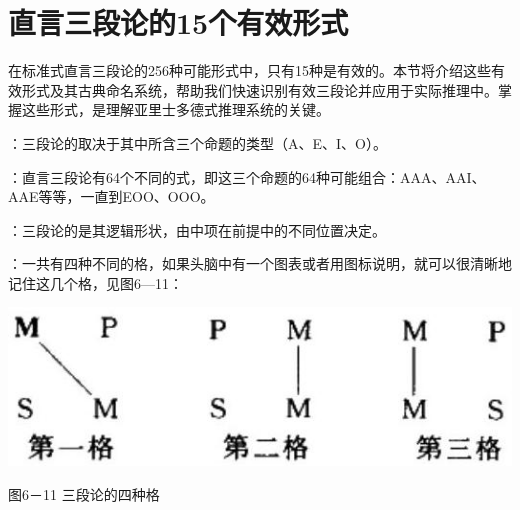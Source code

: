 \section{直言三段论的15个有效形式}

\begin{logicbox}[title=引言]
在标准式直言三段论的256种可能形式中，只有15种是有效的。本节将介绍这些有效形式及其古典命名系统，帮助我们快速识别有效三段论并应用于实际推理中。掌握这些形式，是理解亚里士多德式推理系统的关键。
\end{logicbox}

\begin{theorembox}[title=三段论的式与格]
：三段论的取决于其中所含三个命题的类型（A、E、I、O）。

：直言三段论有64个不同的式，即这三个命题的64种可能组合：AAA、AAI、AAE等等，一直到EOO、OOO。

：三段论的是其逻辑形状，由中项在前提中的不同位置决定。

：一共有四种不同的格，如果头脑中有一个图表或者用图标说明，就可以很清晰地记住这几个格，见图6—11：
\end{theorembox}

\begin{center}
\includegraphics[width=\textwidth]{images/2025_05_15_6a28331d5e7c993ad07ag-288.jpg}

图6－11 三段论的四种格
\end{center}


